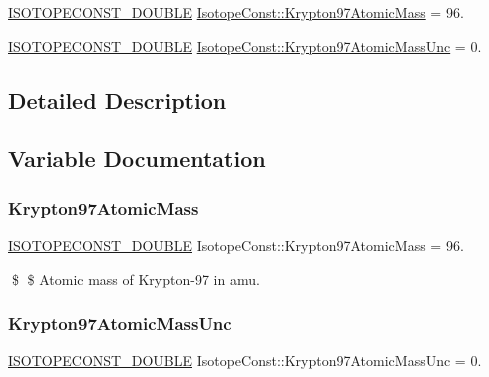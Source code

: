 \begin{DoxyCompactItemize}
\item 
\mbox{\hyperlink{group___isotope_const-_macros_ga8f45a7272ce02c0b4c65c44636ed719a}{I\+S\+O\+T\+O\+P\+E\+C\+O\+N\+S\+T\+\_\+\+D\+O\+U\+B\+LE}} \mbox{\hyperlink{group___isotope_const-_krypton-_kr97_gacde1753794495f4a825a1e8f88926bcd}{Isotope\+Const\+::\+Krypton97\+Atomic\+Mass}} = 96.
\item 
\mbox{\hyperlink{group___isotope_const-_macros_ga8f45a7272ce02c0b4c65c44636ed719a}{I\+S\+O\+T\+O\+P\+E\+C\+O\+N\+S\+T\+\_\+\+D\+O\+U\+B\+LE}} \mbox{\hyperlink{group___isotope_const-_krypton-_kr97_ga00619df46e12dacefcaee8d953b82345}{Isotope\+Const\+::\+Krypton97\+Atomic\+Mass\+Unc}} = 0.
\end{DoxyCompactItemize}


\subsection{Detailed Description}


\subsection{Variable Documentation}
\mbox{\label{group___isotope_const-_krypton-_kr97_gacde1753794495f4a825a1e8f88926bcd}} 
\subsubsection{\texorpdfstring{Krypton97\+Atomic\+Mass}{Krypton97AtomicMass}}
{\footnotesize\ttfamily \mbox{\hyperlink{group___isotope_const-_macros_ga8f45a7272ce02c0b4c65c44636ed719a}{I\+S\+O\+T\+O\+P\+E\+C\+O\+N\+S\+T\+\_\+\+D\+O\+U\+B\+LE}} Isotope\+Const\+::\+Krypton97\+Atomic\+Mass = 96.}

\$ \$ Atomic mass of Krypton-\/97 in amu. \mbox{\label{group___isotope_const-_krypton-_kr97_ga00619df46e12dacefcaee8d953b82345}} 
\subsubsection{\texorpdfstring{Krypton97\+Atomic\+Mass\+Unc}{Krypton97AtomicMassUnc}}
{\footnotesize\ttfamily \mbox{\hyperlink{group___isotope_const-_macros_ga8f45a7272ce02c0b4c65c44636ed719a}{I\+S\+O\+T\+O\+P\+E\+C\+O\+N\+S\+T\+\_\+\+D\+O\+U\+B\+LE}} Isotope\+Const\+::\+Krypton97\+Atomic\+Mass\+Unc = 0.}

